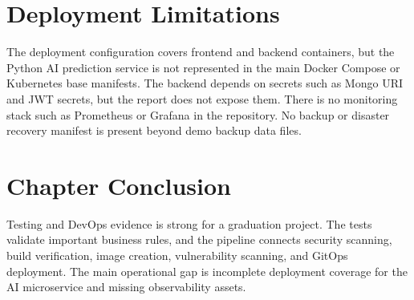 \section{Deployment Limitations}
The deployment configuration covers frontend and backend containers, but the Python AI prediction service is not represented in the main Docker Compose or Kubernetes base manifests. The backend depends on secrets such as Mongo URI and JWT secrets, but the report does not expose them. There is no monitoring stack such as Prometheus or Grafana in the repository. No backup or disaster recovery manifest is present beyond demo backup data files.

\section{Chapter Conclusion}
Testing and DevOps evidence is strong for a graduation project. The tests validate important business rules, and the pipeline connects security scanning, build verification, image creation, vulnerability scanning, and GitOps deployment. The main operational gap is incomplete deployment coverage for the AI microservice and missing observability assets.
